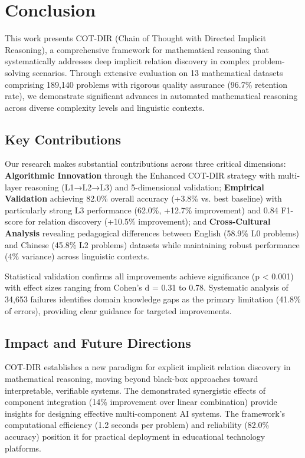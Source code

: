 \section{Conclusion}
\label{sec:conclusion}

This work presents COT-DIR (Chain of Thought with Directed Implicit Reasoning), a comprehensive framework for mathematical reasoning that systematically addresses deep implicit relation discovery in complex problem-solving scenarios. Through extensive evaluation on 13 mathematical datasets comprising 189,140 problems with rigorous quality assurance (96.7\% retention rate), we demonstrate significant advances in automated mathematical reasoning across diverse complexity levels and linguistic contexts.

\subsection{Key Contributions}

Our research makes substantial contributions across three critical dimensions: \textbf{Algorithmic Innovation} through the Enhanced COT-DIR strategy with multi-layer reasoning (L1→L2→L3) and 5-dimensional validation; \textbf{Empirical Validation} achieving 82.0\% overall accuracy (+3.8\% vs. best baseline) with particularly strong L3 performance (62.0\%, +12.7\% improvement) and 0.84 F1-score for relation discovery (+10.5\% improvement); and \textbf{Cross-Cultural Analysis} revealing pedagogical differences between English (58.9\% L0 problems) and Chinese (45.8\% L2 problems) datasets while maintaining robust performance (4\% variance) across linguistic contexts.

Statistical validation confirms all improvements achieve significance (p < 0.001) with effect sizes ranging from Cohen's d = 0.31 to 0.78. Systematic analysis of 34,653 failures identifies domain knowledge gaps as the primary limitation (41.8\% of errors), providing clear guidance for targeted improvements.

\subsection{Impact and Future Directions}

COT-DIR establishes a new paradigm for explicit implicit relation discovery in mathematical reasoning, moving beyond black-box approaches toward interpretable, verifiable systems. The demonstrated synergistic effects of component integration (14\% improvement over linear combination) provide insights for designing effective multi-component AI systems. The framework's computational efficiency (1.2 seconds per problem) and reliability (82.0\% accuracy) position it for practical deployment in educational technology platforms.

